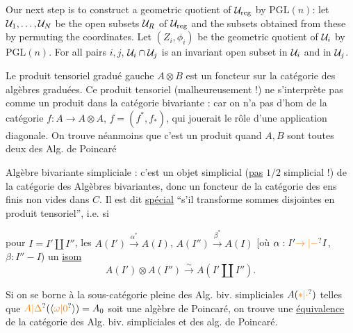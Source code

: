 Our next step is to construct a geometric quotient of $\mathcal U_{\mathrm{reg}}$ by $\mathrm{PGL}(n)$: let $\mathcal U_1,\ldots,\mathcal U_N$ be the open subsets $\mathcal U_R$ of $\mathcal U_{\mathrm{reg}}$ and the subsets obtained from these by permuting the coordinates. Let $(Z_i,\phi_i)$ be the geometric quotient of $\mathcal U_i$ by $\mathrm{PGL}(n)$. For all pairs $i,j$, $\mathcal U_i\cap\mathcal U_j$ is an invariant open subset in $\mathcal U_i$ and in $\mathcal U_j$.


Le produit tensoriel gradué gauche $A\otimes B$ est un foncteur sur la catégorie  des algèbres graduées. Ce produit tensoriel (malheureusement !) ne s'interprète pas comme un produit dans la catégorie bivariante : car on n'a pas d'hom de la catégorie $f:A\to A\otimes A$, $f=(f^*,f_*)$, qui jouerait le rôle d'une application diagonale. On trouve néanmoins que c'est un produit  quand $A,B$ sont toutes deux des Alg. de Poincaré\unsure{\ldots}

Algèbre bivariante simpliciale : c'est un objet simplicial (\uline{pas} \uline{$1/2$} simplicial !) de la catégorie des Algèbres bivariantes, donc un foncteur  de la catégorie des ens finis non vides dans $C$. Il est dit \uline{spécial} ``s'il transforme sommes disjointes en produit tensoriel'', i.e. si

pour $I=I'\amalg I''$, les 
$A(I')\xrightarrow{\alpha^*}A(I)$, $A(I'')\xrightarrow{\beta^*}A(I)$
[où $\alpha:I'\unsure{\to|-}I$, $\beta:I''-I$)  un \uline{isom}
\[
A(I')\otimes A(I'')\xrightarrow{\sim}A(I'\amalg I'').
\]

Si  on se borne à la sous-catégorie pleine des Alg. biv. simpliciales $A(\unsure{*|\cdot})$ telles que $\unsure{A|\Delta}(\langle\unsure{\omega|0}\rangle)=A_0$ soit une algèbre de Poincaré, on trouve une \uline{équivalence} de la catégorie des Alg. biv. simpliciales et des alg. de Poincaré.


